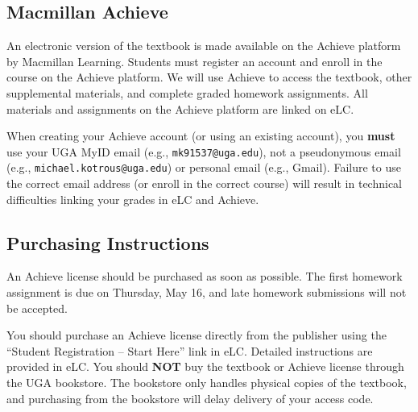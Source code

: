 \subsection*{Macmillan Achieve}
An electronic version of the textbook is made available on the Achieve platform by Macmillan Learning. Students must register an account and enroll in the course on the Achieve platform. We will use Achieve to access the textbook, other supplemental materials, and complete graded homework assignments. All materials and assignments on the Achieve platform are linked on eLC.

When creating your Achieve account (or using an existing account), you \textbf{must} use your UGA MyID email (e.g., \texttt{mk91537@uga.edu}), not a pseudonymous email (e.g., \texttt{michael.kotrous@uga.edu}) or personal email (e.g., Gmail). Failure to use the correct email address (or enroll in the correct course) will result in technical difficulties linking your grades in eLC and Achieve.

\subsection*{Purchasing Instructions}
An Achieve license should be purchased as soon as possible. The first homework assignment is due on Thursday, May 16, and late homework submissions will not be accepted.

You should purchase an Achieve license directly from the publisher using the ``Student Registration -- Start Here'' link in eLC. Detailed instructions are provided in eLC. You should \textbf{NOT} buy the textbook or Achieve license through the UGA bookstore. The bookstore only handles physical copies of the textbook, and purchasing from the bookstore will delay delivery of your access code.
